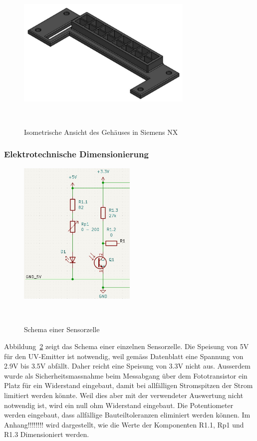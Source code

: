\documentclass[main.tex]{subfiles} %
\begin{document}
\begin{figure}[H]
    \centering
    \includegraphics[width=0.75\textwidth]{fig_Strecke_Tracken/Gehaeuse_Isometrisch.pdf}
    \caption{Isometrische Ansicht des Gehäuses in Siemens NX}~\label{fig:Gehaeuse_Isometrisch}
\end{figure}




\subsubsection{Elektrotechnische Dimensionierung}

\begin{figure}[H]
    \centering
    \includegraphics[width=0.5\textwidth]{fig_Strecke_Tracken/Schema_Sensorzelle.pdf}
    \caption{Schema einer Sensorzelle}~\label{fig:Sensorzelle}
\end{figure}

Abbildung~\ref{fig:Sensorzelle} zeigt das Schema einer einzelnen Sensorzelle. Die Speisung von 5V für 
den UV-Emitter ist notwendig, weil gemäss Datenblatt eine Spannung von 2.9V bis 3.5V abfällt. Daher reicht
eine Speisung von 3.3V nicht aus. Ausserdem wurde als Sicherheitsmassnahme beim Messabgang über dem 
Fototransistor ein Platz für ein Widerstand eingebaut, damit bei allfälligen Stromspitzen der Strom 
limitiert werden könnte. Weil dies aber mit der verwendeter Auswertung nicht notwendig ist, wird ein
null ohm Widerstand eingebaut. Die Potentiometer werden eingebaut, dass allfällige Bauteiltoleranzen
eliminiert werden können. Im Anhang!!!!!!!! wird dargestellt, wie die Werte der Komponenten R1.1, Rp1 und R1.3 
Dimensioniert werden.\\\\
\end{document}
